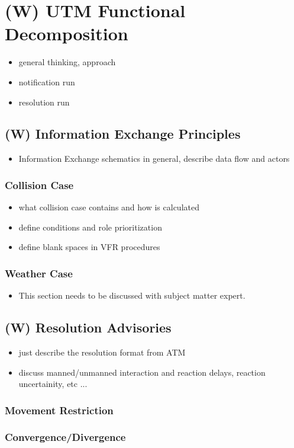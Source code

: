 \section{(W) UTM Functional Decomposition}\label{sec:UTMFunctionaalDecomposition}
\begin{itemize}
    \item general thinking, approach 
    \item notification run
    \item resolution run
\end{itemize}

\subsection{(W) Information Exchange Principles}\label{sec:InformationExchangePrinciples}
\begin{itemize}
    \item Information Exchange schematics in general, describe data flow and actors
\end{itemize}

\subsubsection{ Collision Case}\label{sec:CollisionCase}
\begin{itemize}
    \item what collision case contains and how is calculated
    \item define conditions and role prioritization
    \item define blank spaces in VFR procedures 
\end{itemize}

\subsubsection{ Weather Case}\label{sec:WeatherCase}
\begin{itemize}
    \item This section needs to be discussed with subject matter expert.
\end{itemize}

\subsection{(W) Resolution Advisories}\label{sec:ResolutionAdvisiories}
\begin{itemize}
    \item just describe the resolution format from ATM
    \item discuss manned/unmanned interaction and reaction delays, reaction uncertainity, etc ...
\end{itemize}
\subsubsection{Movement Restriction}\label{sec:MovementRestriction}
\subsubsection{Convergence/Divergence}\label{sec:ConvergenceDivergence}
